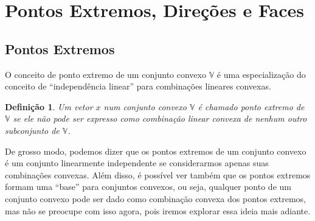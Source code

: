 \newtheorem{def:ponto extremo}[def:conjunto convexo]{Definição}

\newtheorem{def:raio}[def:conjunto convexo]{Definição}

\newtheorem{def:direção}[def:conjunto convexo]{Definição}

\newtheorem{def:direção extrema}[def:conjunto convexo]{Definição}

\newtheorem{def:ponto degenerado}[def:conjunto convexo]{Definição}

\newtheorem{def:face}[def:conjunto convexo]{Definição}


\newtheorem{prop:combinação convexa}{Proposição}[chapter]

\newtheorem{prop:hiperplano e ponto extremo}[prop:combinação convexa]{Proposição}

\newtheorem{prop:direção}[prop:combinação convexa]{Proposição}

\newtheorem{prop:aresta}[prop:combinação convexa]{Proposição}


\newtheorem{thm:ponto extremo}{Teorema}[chapter]

\section{Pontos Extremos, Direções e Faces}

\subsection{Pontos Extremos}

O conceito de ponto extremo de um conjunto convexo $\mathbb{V}$ é uma
especialização do conceito de ``independência linear'' para combinações
lineares convexas.

\begin{def:ponto extremo}
	Um vetor $x$ num conjunto convexo $\mathbb{V}$ é chamado ponto extremo de
	$\mathbb{V}$ se ele não pode ser expresso como combinação linear
	convexa de nenhum outro subconjunto de $\mathbb{V}$.
\end{def:ponto extremo}

De grosso modo, podemos dizer que os pontos extremos de um conjunto convexo
é um conjunto linearmente independente se considerarmos apenas suas combinações
convexas. Além disso, é possível ver também que os pontos extremos formam
uma ``base'' para conjuntos convexos, ou seja, qualquer ponto de um conjunto
convexo pode ser dado como combinação convexa dos pontos extremos, mas não se
preocupe com isso agora, pois iremos explorar essa ideia mais adiante.

